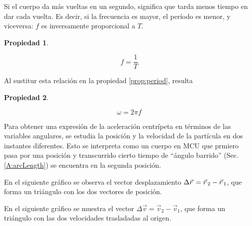 \documentclass[a5paper,12pt,twoside]{book}
\newtheorem{prop}{{Propiedad}}[chapter]
\begin{document}
Si el cuerpo da más vueltas en un segundo, significa que tarda menos tiempo en dar cada vuelta.
Es decir, si la frecuencia es mayor, el período es menor, y viceversa: $f$ es inversamente proporcional a $T$.

\begin{mdframed}[style=MyFrame1]
    \begin{prop}
    \end{prop}
    \begin{equation*}
        f = \dfrac{1}{T}
    \end{equation*}
\end{mdframed}

Al sustitur esta relación en la propiedad \ref{prop:period}, resulta

\begin{mdframed}[style=MyFrame1]
    \begin{prop}
    \end{prop}
    \begin{equation*}
        \omega = 2 \pi f
    \end{equation*}
\end{mdframed}

Para obtener una expresión de la aceleración centrípeta en términos de las variables angulares, se estudia la posición y la velocidad de la partícula en dos instantes diferentes. Esto se interpreta como un cuerpo en MCU que prmiero pasa por una posición y transcurrido cierto tiempo de ``ángulo barrido'' (Sec. \ref{A:arcLength}) se encuentra en la segunda posición. 

\begin{center}
    \def\svgwidth{0.8\linewidth}
    
\end{center}

En el siguiente gráfico se observa el vector desplazamiento $\Delta \vec{r}\hspace{0.05cm} = \vec{r}\hspace{0.05cm}_2-\vec{r}\hspace{0.05cm}_1$, que forma un triángulo con los dos vectores de posición.

\begin{center}
    \def\svgwidth{0.8\linewidth}
    
\end{center}

En el siguiente gráfico se muestra el vector $\Delta \Vec{v} = \Vec{v}_2-\Vec{v}_1$, que forma un triángulo con las dos velocidades trasladadas al origen.

\begin{center}
    \def\svgwidth{0.8\linewidth}
    
\end{center}
\end{document}
